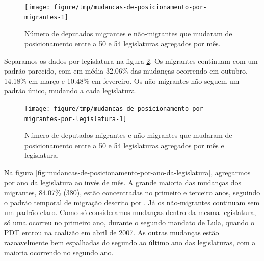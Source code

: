 \documentclass[a4paper,titlepage]{ppgi}\usepackage[]{graphicx}\usepackage[]{color}
\newenvironment{knitrout}{}{} %
\begin{document}
\begin{knitrout}
\color{fgcolor}\begin{figure}
\texttt{[image: figure/tmp/mudancas-de-posicionamento-por-migrantes-1]} \caption[Número de deputados migrantes e não-migrantes que mudaram de posicionamento entre a 50\textordfeminine{} e 54\textordfeminine{} legislaturas agregados por mês]{Número de deputados migrantes e não-migrantes que mudaram de posicionamento entre a 50\textordfeminine{} e 54\textordfeminine{} legislaturas agregados por mês.}\label{fig:mudancas-de-posicionamento-por-migrantes}
\end{figure}


\end{knitrout}

Separamos os dados por legislatura na figura
\ref{fig:mudancas-de-posicionamento-por-migrantes-por-legislatura}. Os
migrantes continuam com um padrão parecido, com em média
32.06\%
das mudanças ocorrendo em outubro,
14.18\%
em março e
10.48\%
em fevereiro. Os não-migrantes não seguem um padrão único, mudando a cada
legislatura.

\begin{knitrout}
\color{fgcolor}\begin{figure}
\texttt{[image: figure/tmp/mudancas-de-posicionamento-por-migrantes-por-legislatura-1]} \caption[Número de deputados migrantes e não-migrantes que mudaram de posicionamento entre a 50\textordfeminine{} e 54\textordfeminine{} legislaturas agregados por mês e legislatura]{Número de deputados migrantes e não-migrantes que mudaram de posicionamento entre a 50\textordfeminine{} e 54\textordfeminine{} legislaturas agregados por mês e legislatura.}\label{fig:mudancas-de-posicionamento-por-migrantes-por-legislatura}
\end{figure}


\end{knitrout}

Na figura \ref{fig:mudancas-de-posicionamento-por-ano-da-legislatura},
agregarmos por ano da legislatura ao invés de mês. A grande maioria das
mudanças dos migrantes,
84.07\%
(380), estão concentradas no
primeiro e terceiro anos, seguindo o padrão temporal de migração descrito por
. Já os não-migrantes continuam sem um padrão claro.
Como só consideramos mudanças dentro da mesma legislatura, só uma ocorreu no
primeiro ano, durante o segundo mandato de Lula, quando o PDT entrou na
coalizão em abril de 2007. As outras mudanças estão razoavelmente bem
espalhadas do segundo ao último ano das legislaturas, com a maioria ocorrendo
no segundo ano.
\end{document}
